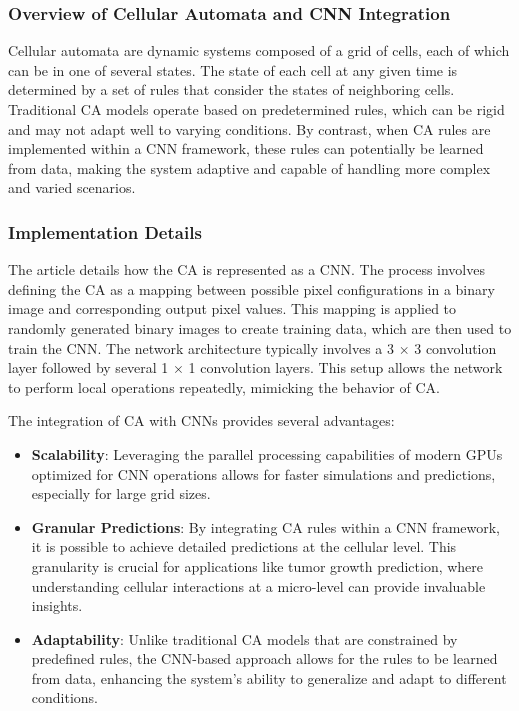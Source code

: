 \documentclass[9pt,a4paper,twoside]{tau-class/tau}
\begin{document}
\subsubsection{Overview of Cellular Automata and CNN Integration}

Cellular automata are dynamic systems composed of a grid of cells, each of which can be in one of several states. The state of each cell at any given time is determined by a set of rules that consider the states of neighboring cells. Traditional CA models operate based on predetermined rules, which can be rigid and may not adapt well to varying conditions. By contrast, when CA rules are implemented within a CNN framework, these rules can potentially be learned from data, making the system adaptive and capable of handling more complex and varied scenarios.

\subsubsection{Implementation Details}

The article details how the CA is represented as a CNN. The process involves defining the CA as a mapping between possible pixel configurations in a binary image and corresponding output pixel values. This mapping is applied to randomly generated binary images to create training data, which are then used to train the CNN. The network architecture typically involves a 3 $×$ 3 convolution layer followed by several 1 $×$ 1 convolution layers. This setup allows the network to perform local operations repeatedly, mimicking the behavior of CA.

The integration of CA with CNNs provides several advantages:

\begin{itemize}
    \item \textbf{Scalability}: Leveraging the parallel processing capabilities of modern GPUs optimized for CNN operations allows for faster simulations and predictions, especially for large grid sizes.
    \item \textbf{Granular Predictions}: By integrating CA rules within a CNN framework, it is possible to achieve detailed predictions at the cellular level. This granularity is crucial for applications like tumor growth prediction, where understanding cellular interactions at a micro-level can provide invaluable insights.
    \item \textbf{Adaptability}: Unlike traditional CA models that are constrained by predefined rules, the CNN-based approach allows for the rules to be learned from data, enhancing the system's ability to generalize and adapt to different conditions.
\end{itemize}
\end{document}
